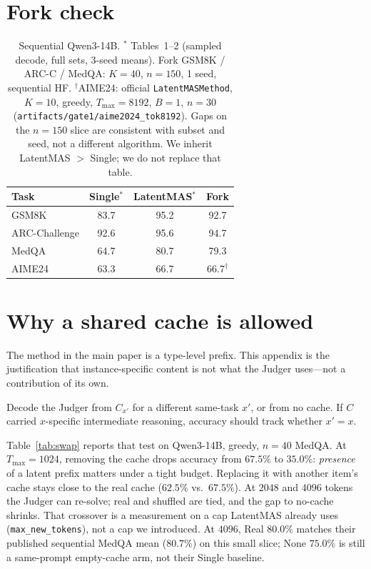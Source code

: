 \documentclass[11pt]{article}
\begin{document}
\section{Fork check}
\label{app:fork}
\begin{table}[h]
\centering
\small
\begin{tabular}{lccc}
\toprule
Task & Single$^{*}$ & LatentMAS$^{*}$ & Fork \\
\midrule
GSM8K & 83.7 & 95.2 & 92.7 \\
ARC-Challenge & 92.6 & 95.6 & 94.7 \\
MedQA & 64.7 & 80.7 & 79.3 \\
AIME24 & 63.3 & 66.7 & 66.7$^{\dagger}$ \\
\bottomrule
\end{tabular}
\caption{Sequential Qwen3-14B.
$^{*}$\citet{zou2025latentmas} Tables~1--2 (sampled decode,
full sets, 3-seed means).
Fork GSM8K / ARC-C / MedQA: $K{=}40$, $n{=}150$, 1 seed, sequential HF.
$^{\dagger}$AIME24: official \texttt{LatentMASMethod}, $K{=}10$,
greedy, $T_{\max}{=}8192$, $B{=}1$, $n{=}30$
(\texttt{artifacts/gate1/aime2024\_tok8192}).
Gaps on the $n{=}150$ slice are consistent with subset and seed, not a
different algorithm.
We inherit LatentMAS $>$ Single; we do not replace that table.}
\end{table}

\section{Why a shared cache is allowed}
\label{app:swap}
The method in the main paper is a type-level prefix.
This appendix is the justification that instance-specific content is
not what the Judger uses---not a contribution of its own.

Decode the Judger from $C_{x'}$ for a different same-task $x'$, or from
no cache.
If $C$ carried $x$-specific intermediate reasoning, accuracy should
track whether $x'=x$.

Table~\ref{tab:swap} reports that test on Qwen3-14B, greedy, $n{=}40$
MedQA.
At $T_{\max}{=}1024$, removing the cache drops accuracy from $67.5\%$ to
$35.0\%$: \emph{presence} of a latent prefix matters under a tight
budget.
Replacing it with another item's cache stays close to the real cache
($62.5\%$ vs.\ $67.5\%$).
At $2048$ and $4096$ tokens the Judger can re-solve; real and shuffled
are tied, and the gap to no-cache shrinks.
That crossover is a measurement on a cap LatentMAS already uses
(\texttt{max\_new\_tokens}), not a cap we introduced.
At $4096$, Real $80.0\%$ matches their published sequential MedQA mean
($80.7\%$) on this small slice; None $75.0\%$ is still a same-prompt
empty-cache arm, not their Single baseline.
\end{document}
